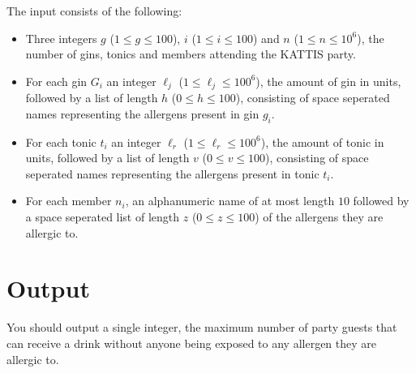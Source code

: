 The input consists of the following:

\begin{itemize}
\item Three integers $g$ ($1 \leq g \leq 100$), $i$ ($1 \leq i \leq 100$) and $n$ ($1 \leq n \leq 10^6$), the number of gins, tonics and members attending the KATTIS party.

\item For each gin $G_i$ an integer $\ell_j$ ($1 \leq \ell_j \leq100^6$), the amount of gin in units, followed by a list of length $h$ ($0 \leq h \leq 100$), consisting of space seperated names representing the allergens present in gin $g_i$.

\item For each tonic $t_i$ an integer $\ell_r$ ($1 \leq \ell_r \leq 100^6$), the amount of tonic in units, followed by a list of length $v$ ($0 \leq v \leq 100$), consisting of space seperated names representing the allergens present in tonic $t_i$.

\item For each member $n_i$, an alphanumeric name of at most length $10$ followed by a space seperated list of length $z$ ($0 \leq z \leq 100$) of the allergens they are allergic to.
\end{itemize}

\section*{Output}

You should output a single integer, the maximum number of party guests that can receive a drink without anyone being exposed to any allergen they are allergic to.